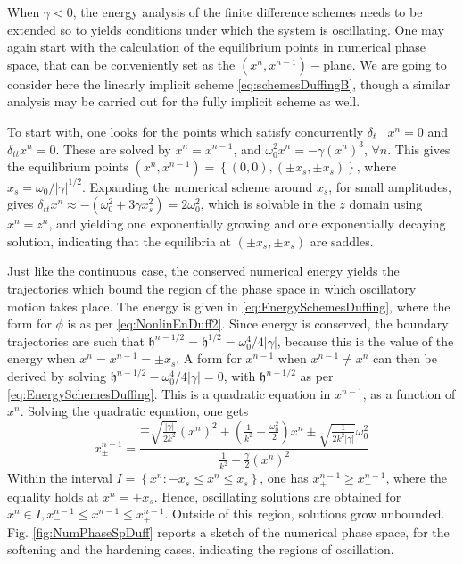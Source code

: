 \documentclass[11pt,twoside,a4paper,english]{book}
\newcommand{\dtm}{\delta_{t-}}
\newcommand{\dtt}{\delta_{tt}}
\begin{document}
When $\gamma < 0$, the energy analysis of the finite difference schemes needs to be extended so to yields conditions under which the system is oscillating. One may again start with the calculation of the equilibrium points in numerical phase space, that can be conveniently set as the $(x^n,x^{n-1})-$plane. We are going to consider here the linearly implicit scheme \eqref{eq:schemesDuffingB}, though a similar analysis may be carried out for the fully implicit scheme as well.  

To start with, one looks for the points which satisfy concurrently $\dtm x^n = 0$ and $\dtt x^n = 0$. These are solved by $x^n = x^{n-1}$, and $\omega_0^2 x^n = -\gamma (x^n)^3$, $\forall n$. This gives the equilibrium points $(x^n,x^{n-1}) = \left\{(0,0),(\pm x_s,\pm x_s) \right\}$, where $x_s= \omega_0/|\gamma|^{1/2}$. Expanding the numerical scheme around $x_s$, for small amplitudes, gives $\dtt x^n \approx - (\omega_0^2 + 3 \gamma x_s^2) = 2\omega_0^2$, which is solvable in the $z$ domain using $x^n = z^n$, and yielding one exponentially growing and one exponentially decaying solution, indicating that the equilibria at $(\pm x_s, \pm x_s)$ are saddles. 

Just like the continuous case, the conserved numerical energy yields the trajectories which bound the region of the phase space in which oscillatory motion takes place. The energy is given in \eqref{eq:EnergySchemesDuffing}, where the form for $\phi$ is as per \eqref{eq:NonlinEnDuff2}. Since energy is conserved, the boundary trajectories are such that $\mathfrak{h}^{n-1/2}=\mathfrak{h}^{1/2}=\omega_0^4/4|\gamma|$, because this is the value of the energy when  $x^n = x^{n-1} = \pm x_s$. A form for $x^{n-1}$ when $x^{n-1} \neq x^n$ can then be derived by solving $\mathfrak{h}^{n-1/2} - \omega_0^4/4|\gamma| = 0$, with  $\mathfrak{h}^{n-1/2}$ as per \eqref{eq:EnergySchemesDuffing}. This is a quadratic equation in $x^{n-1}$, as a function of $x^n$. Solving the quadratic equation, one gets
\begin{equation}
x^{n-1}_\pm = \frac{\mp  \sqrt{\frac{|\gamma|}{2k^2}} (x^n)^2 + \left(\frac{1}{k^2}-\frac{\omega_0^2}{2}\right)x^n \pm \sqrt{\frac{1}{2k^2|\gamma|}}\omega_0^2}{\frac{1}{k^2}+\frac{\gamma}{2}(x^n)^2}
\end{equation}
Within the interval $I = \left\{ x^n :-x_s \leq x^n \leq x_s\right\}$, one has $x^{n-1}_+ \geq x^{n-1}_-$, where the equality holds at $x^{n}=\pm x_s$. Hence, oscillating solutions are obtained for $x^n \in I, x^{n-1}_- \leq x^{n-1} \leq x^{n-1}_+.$ Outside of this region, solutions grow unbounded. Fig. \ref{fig:NumPhaseSpDuff} reports a sketch of the numerical phase space, for the softening and the hardening cases, indicating the regions of oscillation.
\end{document}
